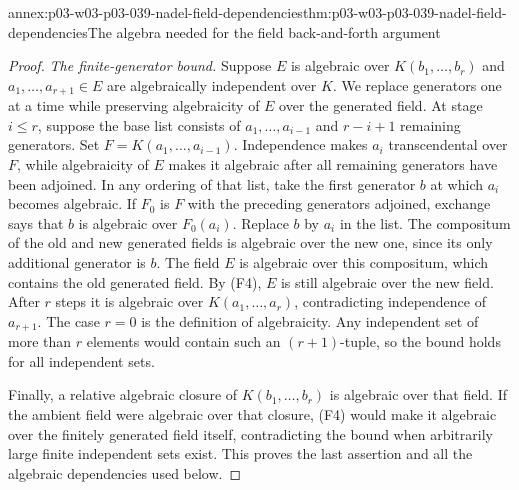 \begin{annexitem}{annex:p03-w03-p03-039-nadel-field-dependencies}{thm:p03-w03-p03-039-nadel-field-dependencies}{The algebra needed for the field back-and-forth argument}
\begin{proof}
\emph{The finite-generator bound.} Suppose \(E\) is algebraic over
\(K(b_1,\ldots,b_r)\) and \(a_1,\ldots,a_{r+1}\in E\) are
algebraically independent over \(K\). We replace generators one at a
time while preserving algebraicity of \(E\) over the generated field.
At stage \(i\leq r\), suppose the base list consists of
\(a_1,\ldots,a_{i-1}\) and \(r-i+1\) remaining generators. Set
\(F=K(a_1,\ldots,a_{i-1})\). Independence makes \(a_i\)
transcendental over \(F\), while algebraicity of \(E\) makes it
algebraic after all remaining generators have been adjoined. In any
ordering of that list, take the first generator \(b\) at which
\(a_i\) becomes algebraic. If \(F_0\) is \(F\) with the preceding
generators adjoined, exchange says that \(b\) is algebraic over
\(F_0(a_i)\). Replace \(b\) by \(a_i\) in the list. The compositum
of the old and new generated fields is algebraic over the new one,
since its only additional generator is \(b\). The field \(E\) is
algebraic over this compositum, which contains the old generated field.
By (F4), \(E\) is still algebraic over the new field. After \(r\) steps it is algebraic
over \(K(a_1,\ldots,a_r)\), contradicting independence of
\(a_{r+1}\). The case \(r=0\) is the definition of algebraicity.
Any independent set of more than \(r\) elements would contain such an
\((r+1)\)-tuple, so the bound holds for all independent sets.

Finally, a relative algebraic closure of
\(K(b_1,\ldots,b_r)\) is algebraic over that field. If the ambient
field were algebraic over that closure, (F4) would make it algebraic
over the finitely generated field itself, contradicting the bound
when arbitrarily large finite independent sets exist. This proves
the last assertion and all the algebraic dependencies used below.
\end{proof}
\end{annexitem}

